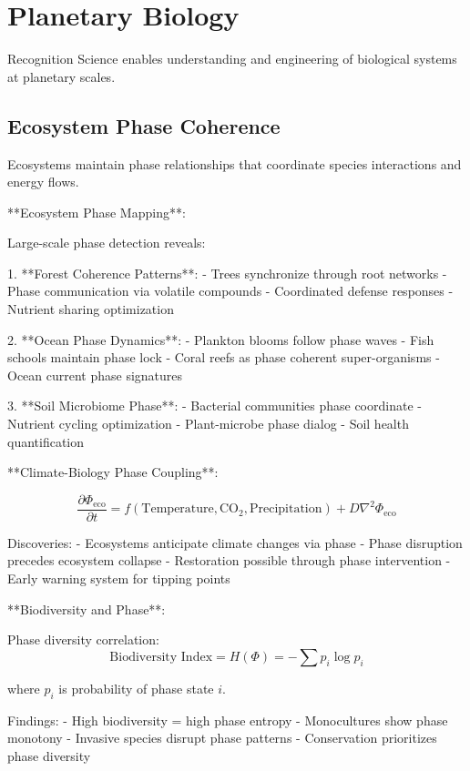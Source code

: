 \documentclass[12pt,a4paper]{report}
\begin{document}
\section{Planetary Biology}

Recognition Science enables understanding and engineering of biological systems at planetary scales.

\subsection{Ecosystem Phase Coherence}

Ecosystems maintain phase relationships that coordinate species interactions and energy flows.

**Ecosystem Phase Mapping**:

Large-scale phase detection reveals:

1. **Forest Coherence Patterns**:
   - Trees synchronize through root networks
   - Phase communication via volatile compounds
   - Coordinated defense responses
   - Nutrient sharing optimization

2. **Ocean Phase Dynamics**:
   - Plankton blooms follow phase waves
   - Fish schools maintain phase lock
   - Coral reefs as phase coherent super-organisms
   - Ocean current phase signatures

3. **Soil Microbiome Phase**:
   - Bacterial communities phase coordinate
   - Nutrient cycling optimization
   - Plant-microbe phase dialog
   - Soil health quantification

**Climate-Biology Phase Coupling**:

\begin{equation}
\frac{\partial \Phi_{\text{eco}}}{\partial t} = f(\text{Temperature}, \text{CO}_2, \text{Precipitation}) + D\nabla^2\Phi_{\text{eco}}
\end{equation}

Discoveries:
- Ecosystems anticipate climate changes via phase
- Phase disruption precedes ecosystem collapse
- Restoration possible through phase intervention
- Early warning system for tipping points

**Biodiversity and Phase**:

Phase diversity correlation:
\begin{equation}
\text{Biodiversity Index} = H(\Phi) = -\sum p_i \log p_i
\end{equation}

where $p_i$ is probability of phase state $i$.

Findings:
- High biodiversity = high phase entropy
- Monocultures show phase monotony
- Invasive species disrupt phase patterns
- Conservation prioritizes phase diversity
\end{document}
